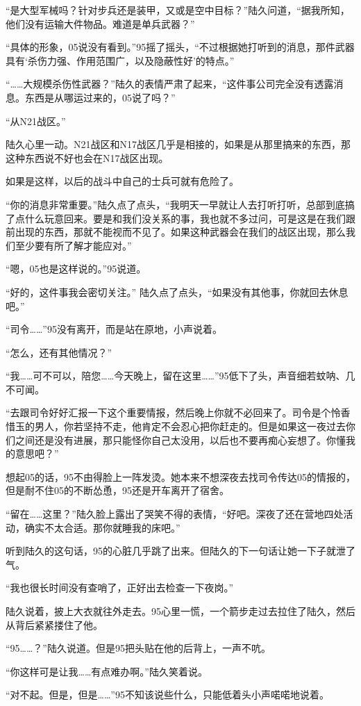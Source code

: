 “是大型军械吗？针对步兵还是装甲，又或是空中目标？”陆久问道，“据我所知，他们没有运输大件物品。难道是单兵武器？”

“具体的形象，05说没有看到。”95摇了摇头，“不过根据她打听到的消息，那件武器具有‘杀伤力强、作用范围广，以及隐蔽性好’的特点。”

“……大规模杀伤性武器？”陆久的表情严肃了起来，“这件事公司完全没有透露消息。东西是从哪运过来的，05说了吗？”

“从N21战区。”

陆久心里一动。N21战区和N17战区几乎是相接的，如果是从那里搞来的东西，那这种东西说不好也会在N17战区出现。

如果是这样，以后的战斗中自己的士兵可就有危险了。

“你的消息非常重要。”陆久点了点头，“我明天一早就让人去打听打听，总部到底搞了点什么玩意回来。要是和我们没关系的事，我也就不多过问，可是这是在我们跟前出现的东西，那就不能视而不见了。如果这种武器会在我们的战区出现，那么我们至少要有所了解才能应对。”

“嗯，05也是这样说的。”95说道。

“好的，这件事我会密切关注。” 陆久点了点头，“如果没有其他事，你就回去休息吧。”

“司令……”95没有离开，而是站在原地，小声说着。

“怎么，还有其他情况？”

“我……可不可以，陪您……今天晚上，留在这里……”95低下了头，声音细若蚊呐、几不可闻。

“去跟司令好好汇报一下这个重要情报，然后晚上你就不必回来了。司令是个怜香惜玉的男人，你若坚持不走，他肯定不会忍心把你赶走的。但是如果这一夜过去你们之间还是没有进展，那只能怪你自己太没用，以后也不要再痴心妄想了。你懂我的意思吧？”

想起05的话，95不由得脸上一阵发烫。她本来不想深夜去找司令传达05的情报的，但是耐不住05的不断怂恿，95还是开车离开了宿舍。

“留在……这里？”陆久脸上露出了哭笑不得的表情，“好吧。深夜了还在营地四处活动，确实不太合适。那你就睡我的床吧。”

听到陆久的这句话，95的心脏几乎跳了出来。但陆久的下一句话让她一下子就泄了气。

“我也很长时间没有查哨了，正好出去检查一下夜岗。”

陆久说着，披上大衣就往外走去。95心里一慌，一个箭步走过去拉住了陆久，然后从背后紧紧搂住了他。

“95……？”陆久说道。但是95把头贴在他的后背上，一声不吭。

“你这样可是让我……有点难办啊。”陆久笑着说。

“对不起。但是，但是……”95不知该说些什么，只能低着头小声喏喏地说着。

